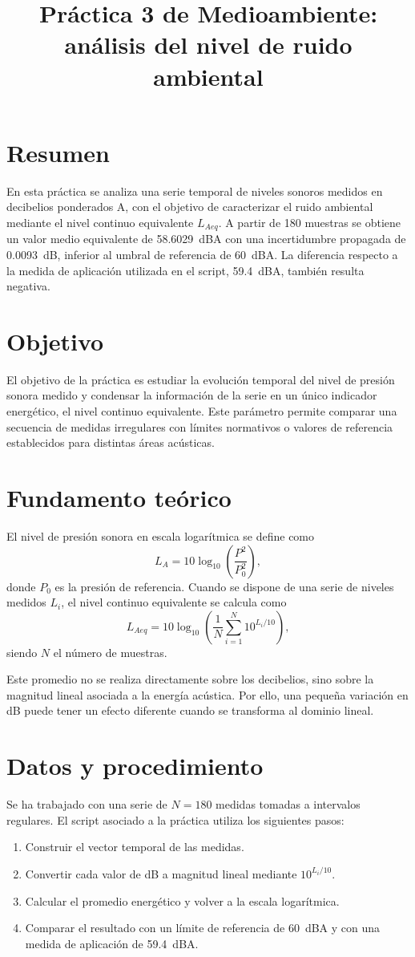 \documentclass[12pt,a4paper]{article}
\title{Práctica 3 de Medioambiente: análisis del nivel de ruido ambiental}
\author{ }
\date{ }
\begin{document}
\maketitle

\section*{Resumen}
En esta práctica se analiza una serie temporal de niveles sonoros medidos en decibelios ponderados A, con el objetivo de caracterizar el ruido ambiental mediante el nivel continuo equivalente $L_{Aeq}$. A partir de 180 muestras se obtiene un valor medio equivalente de \SI{58.6029}{dBA} con una incertidumbre propagada de \SI{0.0093}{dB}, inferior al umbral de referencia de \SI{60}{dBA}. La diferencia respecto a la medida de aplicación utilizada en el script, \SI{59.4}{dBA}, también resulta negativa.

\section*{Objetivo}
El objetivo de la práctica es estudiar la evolución temporal del nivel de presión sonora medido y condensar la información de la serie en un único indicador energético, el nivel continuo equivalente. Este parámetro permite comparar una secuencia de medidas irregulares con límites normativos o valores de referencia establecidos para distintas áreas acústicas.

\section*{Fundamento teórico}
El nivel de presión sonora en escala logarítmica se define como
\[
L_A = 10\log_{10}\!\left(\frac{P^2}{P_0^2}\right),
\]
donde $P_0$ es la presión de referencia. Cuando se dispone de una serie de niveles medidos $L_i$, el nivel continuo equivalente se calcula como
\[
L_{Aeq} = 10\log_{10}\!\left(\frac{1}{N}\sum_{i=1}^{N}10^{L_i/10}\right),
\]
siendo $N$ el número de muestras.

Este promedio no se realiza directamente sobre los decibelios, sino sobre la magnitud lineal asociada a la energía acústica. Por ello, una pequeña variación en dB puede tener un efecto diferente cuando se transforma al dominio lineal.

\section*{Datos y procedimiento}
Se ha trabajado con una serie de $N=180$ medidas tomadas a intervalos regulares. El script asociado a la práctica utiliza los siguientes pasos:
\begin{enumerate}
    \item Construir el vector temporal de las medidas.
    \item Convertir cada valor de dB a magnitud lineal mediante $10^{L_i/10}$.
    \item Calcular el promedio energético y volver a la escala logarítmica.
    \item Comparar el resultado con un límite de referencia de \SI{60}{dBA} y con una medida de aplicación de \SI{59.4}{dBA}.
\end{enumerate}
\end{document}
